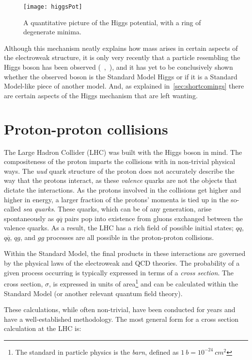 \begin{figure}[h]
\centering
\texttt{[image: higgsPot]} 
\caption[A quantitative picture of the Higgs potential.]{A quantitative picture
of the Higgs potential, with a ring of degenerate minima.}
\label{fig:higgsPot}
\end{figure}

Although this mechanism neatly explains how mass arises in certain aspects of the
electroweak structure, it is only very recently that a particle resembling the
Higgs boson has been observed (~\cite{CMS:higgsObs},~\cite{ATLAS:higgsObs}), and it has yet to be
conclusively shown whether the observed boson is the Standard Model Higgs or if
it is a Standard Model-like piece of another model. And, as explained
in~\ref{sec:shortcomings} there are certain aspects of the Higgs mechanism that
are left wanting.

\section{Proton-proton collisions}
\label{sec:protonCollisions}
The Large Hadron Collider (LHC) was built with the Higgs boson in mind. The
compositeness of the proton imparts the collisions with in non-trivial physical
ways. The \emph{uud} quark structure of the proton does not accurately describe
the way that the protons interact, as these \emph{valence} quarks are not the
objects that dictate the interactions. As the protons involved in the collisions
get higher and higher in energy, a larger fraction of the protons' momenta is
tied up in the so-called \emph{sea quarks}. These quarks, which can be of any
generation, arise spontaneously as $q\overline q$ pairs pop into existence from
gluons exchanged between the valence quarks. As a result, the LHC has a rich
field of possible initial states; $qq$, $q\overline q$, $qg$, and $gg$ processes
are all possible in the proton-proton collisions. 

Within the Standard Model, the final products in these interactions are governed
by the physical laws of the electroweak and QCD theories. The probability of a
given process occurring is typically expressed in terms of a \emph{cross
section}. The cross section, $\sigma$, is expressed in units of
area\footnote{The standard in particle physics is the \emph{barn}, defined as
$1~b = 10^{-24}~cm^2$} and can be calculated within the Standard Model (or
another relevant quantum field theory). 

These calculations, while often non-trivial, have been conducted for years and
have a well-established methodology. The most general form for a cross section
calculation at the LHC is:

